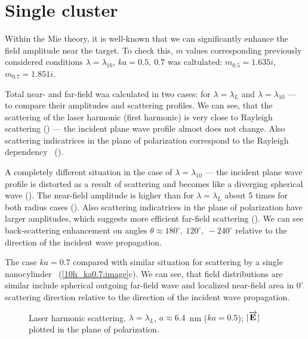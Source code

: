 \section{Single cluster}

Within the Mie theory, it is well-known that we can significantly enhance the field amplitude near the target. To check this, $m$ values corresponding previously considered conditions $\lambda = \lambda_{10}$, $ka = 0.5,\:0.7$ was caltulated: $m_{0.5} = 1.635i$, $m_{0.7} = 1.851i$.

Total near- and far-field waa calculated in two cases: for $\lambda = \lambda_{L}$ and $\lambda = \lambda_{10}$ --- to compare their amplitudes and scattering profiles. We can see, that the scattering of the laser harmonic (first harmonic) is very close to Rayleigh scattering () --- the incident plane wave profile almost does not change. Also scattering indicatrices in the plane of polarization correspond to the Rayleigh dependency~\cite{boren_huffman} ().

A completely different situation in the case of $\lambda = \lambda_{10}$ --- the incident plane wave profile is distorted as a result of scattering and becomes like a diverging spherical wave (). The near-field amplitude is higher than for $\lambda = \lambda_{L}$ about 5 times for both radius cases (). Also scattering indicatrices in the plane of polarization have larger amplitudes, which suggests more efficient far-field scattering (). We can see back-scattering enhancement on angles $\theta \approx 180^{\circ},\:120^{\circ},\:-240^{\circ}$ relative to the direction of the incident wave propagation.

The case $ka = 0.7$ compared with similar situation for scattering by a single nanocylinder~\cite{andreev_lecz} (\autoref{10h_ka0.7:image}c). We can see, that field distributions are similar include spherical outgoing far-field wave and localized near-field area in $0^{\circ}$ scattering direction relative to the direction of the incident wave propagation.

    \begin{figure}[H]
        \hfil
        \caption{Laser harmonic scattering. $\lambda = \lambda_{L}$, $a \approx 6.4$~nm ($ka = 0.5$); $|\overrightarrow{\textbf{E}_{}}|$ plotted in the plane of polarization.}
        \label{1h_ka0.5:image}
    \end{figure}


